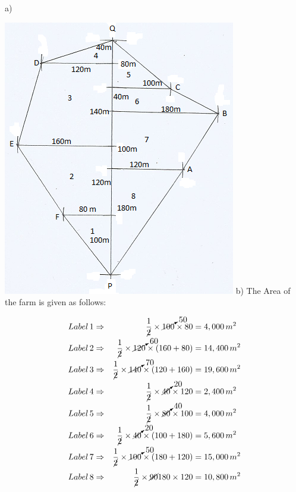 \documentclass[
  a4paperpaper,
]{scrbook}
\begin{document}
\begin{tcolorbox}[enhanced jigsaw, left=2mm, colframe=quarto-callout-caution-color-frame, toptitle=1mm, opacitybacktitle=0.6, rightrule=.15mm, colbacktitle=quarto-callout-caution-color!10!white, colback=white, arc=.35mm, breakable, leftrule=.75mm, bottomtitle=1mm, bottomrule=.15mm, title=\textcolor{quarto-callout-caution-color}{\faFire}\hspace{0.5em}{Solution}, titlerule=0mm, coltitle=black, toprule=.15mm, opacityback=0]

a)

\includegraphics{figures/survey.png} b) The Area of the farm is given as
follows:

\begin{align*}
Label \,1 &\Rightarrow &\frac{1}{\cancel2}\times \cancelto{50}{100}\times80&=4,000 \,m^2\\
Label\,2 &\Rightarrow &\frac{1}{\cancel2}\times \cancelto{60}{120}\times(160+80)&=14,400\,m^2\\
Label\,3 &\Rightarrow &\frac{1}{\cancel2}\times \cancelto{70}{140} \times (120+160)&=19,600 \,m^2\\
Label\,4 &\Rightarrow &\frac{1}{\cancel2} \times \cancelto{20}{40}\times 120&=2,400 \,m^2\\
Label \,5 &\Rightarrow &\frac{1}{\cancel2}\times \cancelto{40}{80}\times100&=4,000 \,m^2\\
Label \, 6 &\Rightarrow &\frac{1}{\cancel2}\times \cancelto{20}{40}\times (100+180)&=5,600\,m^2\\
Label \, 7 &\Rightarrow &\frac{1}{\cancel2}\times \cancelto{50}{100}\times(180+120)&=15,000\,m^2\\
Label \,8 &\Rightarrow &\frac{1}{\cancel2}\times \cancel{90}{180}\times120&=10,800\, m^2\\
\end{align*}


\end{tcolorbox}
\end{document}
